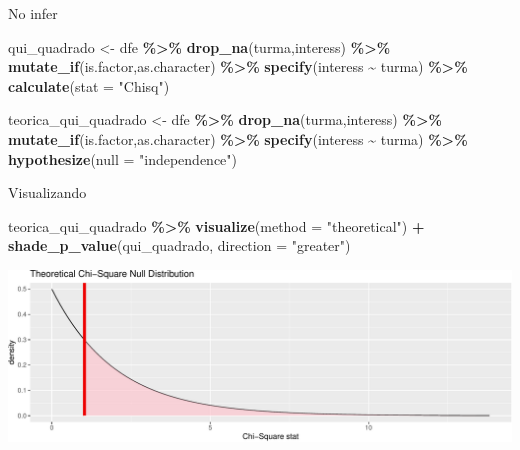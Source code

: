 \documentclass[
  9pt,
  ignorenonframetext,
  aspectratio=169]{beamer}
\newenvironment{Shaded}{\begin{snugshade}}{\end{snugshade}}
\newcommand{\DataTypeTok}[1]{\textcolor[rgb]{0.13,0.29,0.53}{#1}}
\newcommand{\KeywordTok}[1]{\textcolor[rgb]{0.13,0.29,0.53}{\textbf{#1}}}
\newcommand{\NormalTok}[1]{#1}
\newcommand{\OperatorTok}[1]{\textcolor[rgb]{0.81,0.36,0.00}{\textbf{#1}}}
\newcommand{\StringTok}[1]{\textcolor[rgb]{0.31,0.60,0.02}{#1}}
\begin{document}
\begin{frame}[fragile]{No infer}
\protect\hypertarget{no-infer-1}{}
\begin{Shaded}
\begin{Highlighting}[]
\NormalTok{qui\_quadrado \textless{}{-}}\StringTok{ }\NormalTok{dfe }\OperatorTok{\%\textgreater{}\%}\StringTok{ }\KeywordTok{drop\_na}\NormalTok{(turma,interess) }\OperatorTok{\%\textgreater{}\%}
\StringTok{  }\KeywordTok{mutate\_if}\NormalTok{(is.factor,as.character) }\OperatorTok{\%\textgreater{}\%}\StringTok{ }
\StringTok{  }\KeywordTok{specify}\NormalTok{(interess }\OperatorTok{\textasciitilde{}}\StringTok{ }\NormalTok{turma) }\OperatorTok{\%\textgreater{}\%}
\StringTok{  }\KeywordTok{calculate}\NormalTok{(}\DataTypeTok{stat =} \StringTok{"Chisq"}\NormalTok{)}

\NormalTok{teorica\_qui\_quadrado \textless{}{-}}\StringTok{ }\NormalTok{dfe }\OperatorTok{\%\textgreater{}\%}\StringTok{ }\KeywordTok{drop\_na}\NormalTok{(turma,interess) }\OperatorTok{\%\textgreater{}\%}
\StringTok{  }\KeywordTok{mutate\_if}\NormalTok{(is.factor,as.character) }\OperatorTok{\%\textgreater{}\%}\StringTok{ }
\StringTok{  }\KeywordTok{specify}\NormalTok{(interess }\OperatorTok{\textasciitilde{}}\StringTok{ }\NormalTok{turma) }\OperatorTok{\%\textgreater{}\%}
\StringTok{  }\KeywordTok{hypothesize}\NormalTok{(}\DataTypeTok{null =} \StringTok{"independence"}\NormalTok{) }
\end{Highlighting}
\end{Shaded}
\end{frame}

\begin{frame}[fragile]{Visualizando}
\protect\hypertarget{visualizando-3}{}
\begin{Shaded}
\begin{Highlighting}[]
\NormalTok{teorica\_qui\_quadrado }\OperatorTok{\%\textgreater{}\%}
\StringTok{  }\KeywordTok{visualize}\NormalTok{(}\DataTypeTok{method =} \StringTok{"theoretical"}\NormalTok{) }\OperatorTok{+}\StringTok{ }
\StringTok{  }\KeywordTok{shade\_p\_value}\NormalTok{(qui\_quadrado,}
                \DataTypeTok{direction =} \StringTok{"greater"}\NormalTok{)}
\end{Highlighting}
\end{Shaded}

\includegraphics{aula_11_files/figure-beamer/unnamed-chunk-30-1.pdf}
\end{frame}
\end{document}
